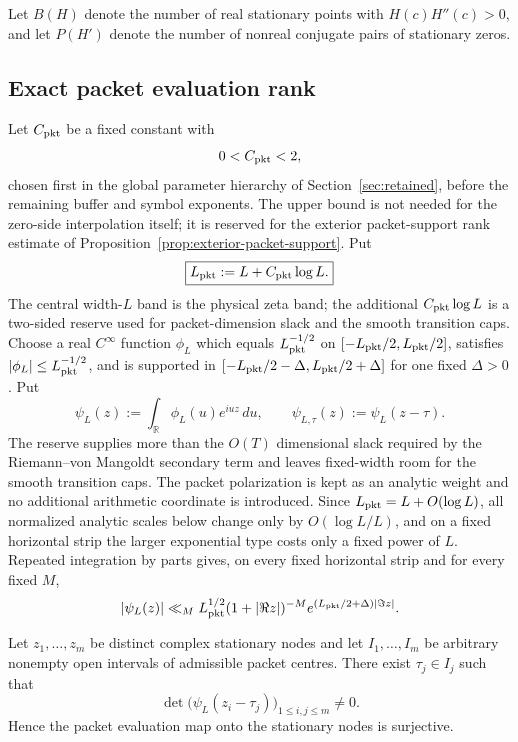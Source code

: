 Let $B(H)$ denote the number of real stationary points with
$H(c)H''(c)>0$, and let $P(H')$ denote the number of nonreal conjugate pairs of
stationary zeros.

\subsection{Exact packet evaluation rank}
Let $C_{\rm pkt}$ be a fixed constant with
\[
0<C_{\rm pkt}<2,
\]
chosen first in the global parameter hierarchy of Section~\ref{sec:retained},
before the remaining buffer and symbol exponents.  The upper bound is not needed
for the zero-side interpolation itself; it is reserved for the exterior
packet-support rank estimate of Proposition~\ref{prop:exterior-packet-support}.
Put
\begin{equation}
\boxed{L_{\rm pkt}:=L+C_{\rm pkt}\log L.}
\label{eq:packet-bandwidth-reserve}
\end{equation}
The central width-$L$ band is the physical zeta band; the additional
$C_{\rm pkt}\log L$ is a two-sided reserve used for packet-dimension slack and
the smooth transition caps.
Choose a real $C^\infty$ function $\phi_L$ which equals
$L_{\rm pkt}^{-1/2}$ on $[-L_{\rm pkt}/2,L_{\rm pkt}/2]$, satisfies
$|\phi_L|\le L_{\rm pkt}^{-1/2}$, and is supported in
$[-L_{\rm pkt}/2-\Delta,L_{\rm pkt}/2+\Delta]$ for one fixed $\Delta>0$. Put
\[
\psi_L(z):=\int_{\mathbb R}\phi_L(u)e^{iuz}\,du,
\qquad
\psi_{L,\tau}(z):=\psi_L(z-\tau).
\]
The reserve supplies more than the $O(T)$ dimensional slack required by the
Riemann--von Mangoldt secondary term and leaves fixed-width room for the smooth
transition caps. The packet polarization is kept as an analytic weight and no
additional arithmetic coordinate is introduced. Since
$L_{\rm pkt}=L+O(\log L)$, all normalized analytic scales below change only by
$O(\log L/L)$, and on a fixed horizontal strip the larger exponential type
costs only a fixed power of $L$.
Repeated integration by parts gives, on every fixed horizontal strip and for
every fixed $M$,
\begin{equation}
|\psi_L(z)|\ll_M L_{\rm pkt}^{1/2}(1+|\Re z|)^{-M}
 e^{(L_{\rm pkt}/2+\Delta)|\Im z|}.
\label{eq:packet-decay}
\end{equation}

\begin{lemma}
\label{lem:evaluation-rank}
Let $z_1,\dots,z_m$ be distinct complex stationary nodes and let
$I_1,\dots,I_m$ be arbitrary nonempty open intervals of admissible packet
centres. There exist $\tau_j\in I_j$ such that
\[
\det\bigl(\psi_L(z_i-\tau_j)\bigr)_{1\le i,j\le m}\ne0.
\]
Hence the packet evaluation map onto the stationary nodes is surjective.
\end{lemma}

